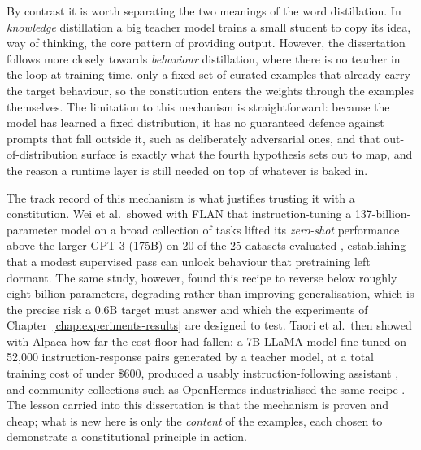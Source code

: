 By contrast it is worth separating the two meanings of the word distillation. In \emph{knowledge} distillation a big teacher model trains a small student to copy its idea, way of thinking, the core pattern of providing output. However, the dissertation follows more closely towards \emph{behaviour} distillation, where there is no teacher in the loop at training time, only a fixed set of curated examples that already carry the target behaviour, so the constitution enters the weights through the examples themselves. The limitation to this mechanism is straightforward: because the model has learned a fixed distribution, it has no guaranteed defence against prompts that fall outside it, such as deliberately adversarial ones, and that out-of-distribution surface is exactly what the fourth hypothesis sets out to map, and the reason a runtime layer is still needed on top of whatever is baked in.

The track record of this mechanism is what justifies trusting it with a constitution. Wei et al.\ showed with FLAN that instruction-tuning a 137-billion-parameter model on a broad collection of tasks lifted its \emph{zero-shot} performance above the larger GPT-3 (175B) on 20 of the 25 datasets evaluated \cite{wei2022finetunedlanguagemodelszeroshot}, establishing that a modest supervised pass can unlock behaviour that pretraining left dormant. The same study, however, found this recipe to reverse below roughly eight billion parameters, degrading rather than improving generalisation, which is the precise risk a 0.6B target must answer and which the experiments of Chapter~\ref{chap:experiments-results} are designed to test. Taori et al.\ then showed with Alpaca how far the cost floor had fallen: a 7B LLaMA model fine-tuned on 52,000 instruction-response pairs generated by a teacher model, at a total training cost of under \$600, produced a usably instruction-following assistant \cite{taori2023alpaca}, and community collections such as OpenHermes industrialised the same recipe \cite{teknium2024openhermes}. The lesson carried into this dissertation is that the mechanism is proven and cheap; what is new here is only the \emph{content} of the examples, each chosen to demonstrate a constitutional principle in action.

